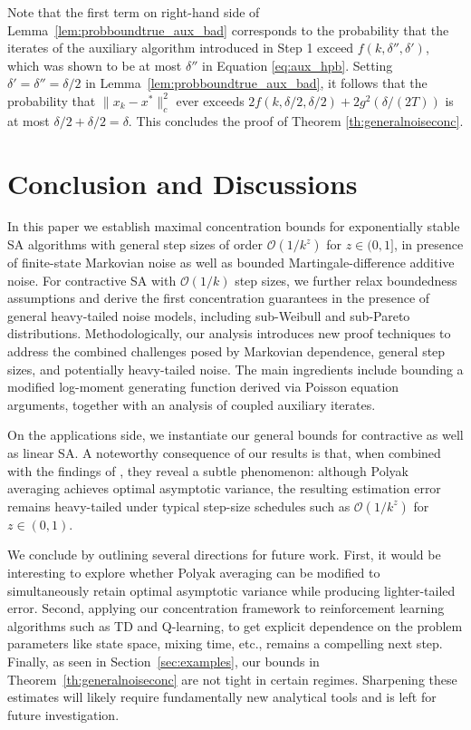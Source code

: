 \documentclass{article}
\newcommand{\xk}{x_k}
\begin{document}
Note that the first term on right-hand side of Lemma~\ref{lem:probboundtrue_aux_bad} corresponds to the probability that the iterates of the auxiliary algorithm introduced in Step 1 exceed $f(k, \delta'', \delta')$, which was shown to be at most $\delta''$ in Equation \eqref{eq:aux_hpb}. %
Setting $\delta' = \delta'' = \delta/2$ in Lemma~\ref{lem:probboundtrue_aux_bad}, it follows that the probability that $\|\xk - x^*\|^2_c$ ever exceeds $2f(k,\delta/2,\delta/2) + 2g^2(\delta/(2T))$ is at most $\delta/2+\delta/2=\delta$. This concludes the proof of Theorem \ref{th:generalnoiseconc}.








\section{Conclusion and Discussions}
In this paper we establish maximal concentration bounds for exponentially stable SA algorithms with general step sizes of order $\mathcal{O}(1/k^z)$ for $z\in (0,1]$, in presence of finite-state Markovian noise as well as bounded Martingale-difference additive noise. For contractive SA with $\mathcal{O}(1/k)$ step sizes, we further relax boundedness assumptions and derive the first concentration guarantees in the presence of general heavy-tailed noise models, including sub-Weibull and sub-Pareto distributions. Methodologically, our analysis introduces new proof techniques to address the combined challenges posed by Markovian dependence, general step sizes, and potentially heavy-tailed noise. The main ingredients include bounding a modified log-moment generating function derived via Poisson equation arguments, together with an analysis of coupled auxiliary iterates.

On the applications side, we instantiate our general bounds for contractive as well as linear SA. A noteworthy consequence of our results is that, when combined with the findings of \citet{khodadadian2025general}, they reveal a subtle phenomenon: although Polyak averaging achieves optimal asymptotic variance, the resulting estimation error remains heavy-tailed under typical step-size schedules such as $\mathcal{O}(1/k^z)$ for $z \in (0,1)$.


We conclude by outlining several directions for future work. First, it would be interesting to explore whether Polyak averaging can be modified to simultaneously retain optimal asymptotic variance while producing lighter-tailed error. Second, applying our concentration framework to reinforcement learning algorithms such as TD and Q-learning, to get explicit dependence on the problem parameters like state space, mixing time, etc.,  remains a compelling next step. Finally, as seen in Section~\ref{sec:examples}, our bounds in Theorem~\ref{th:generalnoiseconc} are not tight in certain regimes. Sharpening these estimates will likely require fundamentally new analytical tools and is left for future investigation.
\end{document}
